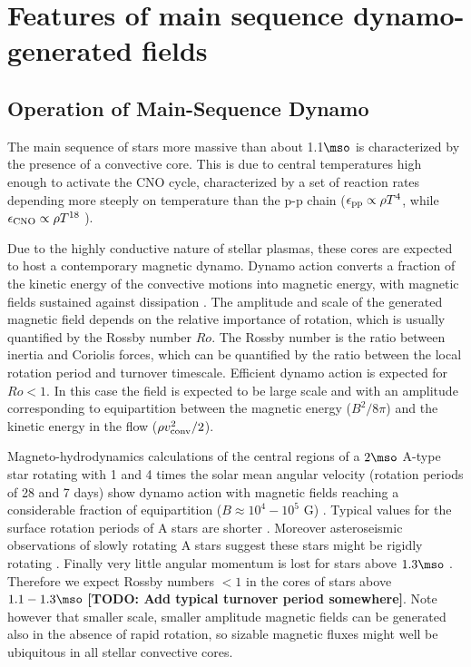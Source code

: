 \section{Features of main sequence dynamo-generated fields}

\subsection{Operation of Main-Sequence Dynamo}

The main sequence of stars more massive than about 1.1$\mso$ is characterized by the presence of a convective core.
This is due to central temperatures high enough to activate the CNO cycle, characterized by a set of reaction rates depending more steeply on temperature than the p-p chain ($\epsilon_{\rm pp}\propto \rho T^{4}$, while $\epsilon_{\rm CNO}\propto \rho T^{18}$ ).

Due to the highly conductive nature of stellar plasmas, 
these cores are expected to host a contemporary magnetic dynamo. Dynamo action converts a fraction of the kinetic energy 
of the convective motions into magnetic energy, with magnetic fields sustained against dissipation  \citep[see e.g.,][]{Brandenburg_2005}. The amplitude and scale of the generated magnetic field depends on the relative importance of rotation, which is usually quantified by the Rossby number $Ro$. The Rossby number is the ratio between inertia and Coriolis forces, which can be quantified by the ratio between the local rotation period and turnover timescale. 
Efficient dynamo action is expected for $Ro<1$. In this case the field is expected to be large scale and with an amplitude corresponding to equipartition between the magnetic energy ($B^2/8\pi$) and the kinetic energy in the flow ($\rho v^2_{\rm conv}/2$). 


Magneto-hydrodynamics calculations of the central regions of a $2\mso$ A-type star rotating with 
1 and 4 times the solar mean angular velocity (rotation periods of 28 and 7 days) show dynamo action 
with magnetic fields reaching a considerable fraction of equipartition ($B \approx 10^4-10^5$ G) \citep{Brun_2005}. Typical values for the surface  rotation periods of A stars are shorter \citep[about 1 day, see e.g.]{Zorec_2012}. Moreover asteroseismic observations of slowly rotating A stars suggest these stars might be rigidly rotating \cite{Kurtz_2014}. Finally very little angular momentum is lost for stars above $1.3\mso$ \citep[Kraft break, see e.g.]{1967ApJ...150..551K,2013ApJ...776...67V}. Therefore we expect Rossby numbers $< 1$ in the cores of stars above $1.1-1.3\mso$ \textbf{[TODO: Add typical turnover period somewhere]}.
Note however that smaller scale, smaller amplitude magnetic fields can be generated also in the absence of rapid rotation, so sizable magnetic fluxes might well be ubiquitous in all stellar convective cores. 

